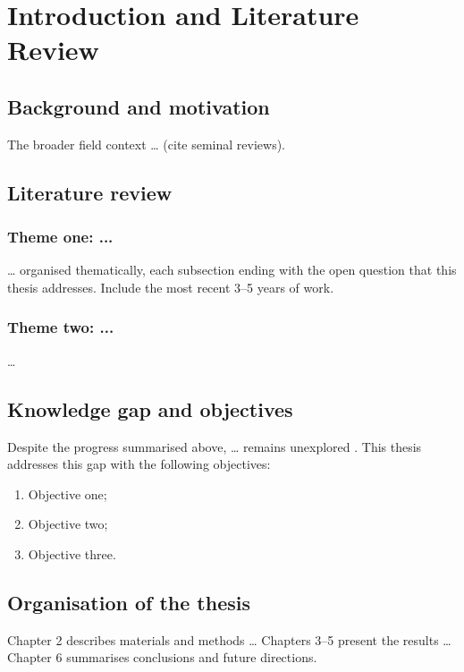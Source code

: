 \chapter{Introduction and Literature Review}
\label{ch:intro}

\section{Background and motivation}
\label{sec:background}
The broader field context \ldots{} (cite seminal reviews).

\section{Literature review}
\label{sec:litrev}
\subsection{Theme one: ...}
\label{sec:theme1}
\ldots{} organised thematically, each subsection ending with the open question
that this thesis addresses. Include the most recent 3--5 years of work.

\subsection{Theme two: ...}
\label{sec:theme2}
\ldots{}

\section{Knowledge gap and objectives}
\label{sec:gap}
Despite the progress summarised above, \ldots{} remains unexplored
\citep{keyref2023}. This thesis addresses this gap with the following
objectives:
\begin{enumerate}
  \item Objective one;
  \item Objective two;
  \item Objective three.
\end{enumerate}

\section{Organisation of the thesis}
\label{sec:org}
Chapter 2 describes materials and methods \ldots{} Chapters 3--5 present the
results \ldots{} Chapter 6 summarises conclusions and future directions.
